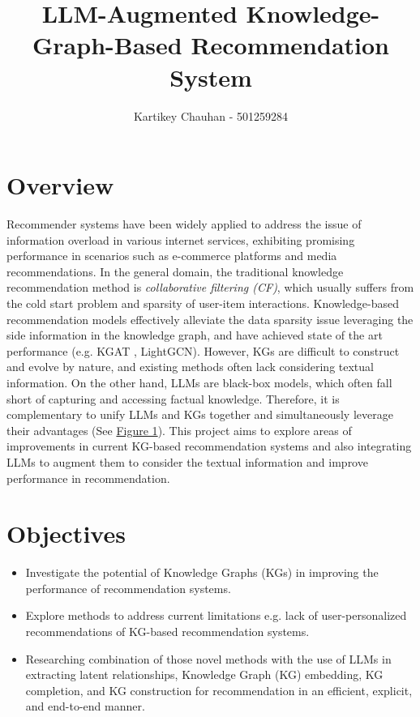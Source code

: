 \documentclass[a4paper]{article}
\title{LLM-Augmented Knowledge-Graph-Based Recommendation System
}
\author{Kartikey Chauhan - 501259284}
\date{}
\begin{document}
\maketitle
\section*{Overview}
Recommender systems have been widely applied to address the issue of information overload in various internet services, exhibiting promising performance in scenarios such as e-commerce platforms and media recommendations. 
In the general domain, the traditional knowledge recommendation method is  \textit{collaborative filtering (CF)}, which usually suffers from the cold start problem and sparsity of user-item interactions. 
Knowledge-based recommendation models effectively alleviate the data sparsity issue leveraging the side information in the knowledge graph, and have achieved state of the art performance\cite{guo2020survey} (e.g. KGAT\cite{wang2019kgat} , LightGCN\cite{he2020lightgcn}).
However, KGs are difficult to construct and evolve by nature, and existing methods often lack considering textual information. On the other hand, LLMs are black-box models, which often fall short of capturing and accessing factual knowledge.
Therefore, it is complementary to unify LLMs and KGs together and simultaneously leverage their advantages (See \hyperref[fig:llm_vs_kg]{Figure 1}).
This project aims to explore areas of improvements in current KG-based recommendation systems and also integrating LLMs to augment them to consider the textual information and improve performance in recommendation.

\section*{Objectives}

\begin{itemize}
\item Investigate the potential of Knowledge Graphs (KGs) in improving the performance of recommendation systems.
\item Explore methods to address current limitations e.g. lack of user-personalized recommendations \cite{pang2024knowledgeaware} \cite{liu2024knowledgeenhanced} of KG-based recommendation systems.
\item Researching combination of those novel methods with the use of LLMs in extracting latent relationships, Knowledge Graph (KG) embedding, KG completion, and KG construction for recommendation in an efficient, explicit, and end-to-end manner. 
\end{itemize}
\end{document}
